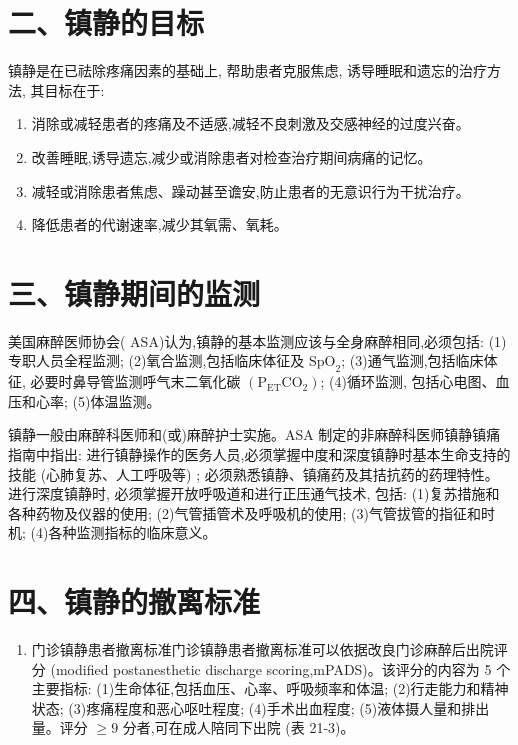 \documentclass[10pt]{article}
\begin{document}
\section*{二、镇静的目标}
镇静是在已祛除疼痛因素的基础上, 帮助患者克服焦虑, 诱导睡眠和遗忘的治疗方法, 其目标在于:

\begin{enumerate}
  \item 消除或减轻患者的疼痛及不适感,减轻不良刺激及交感神经的过度兴奋。

  \item 改善睡眠,诱导遗忘,减少或消除患者对检查治疗期间病痛的记忆。

  \item 减轻或消除患者焦虑、躁动甚至谵安,防止患者的无意识行为干扰治疗。

  \item 降低患者的代谢速率,减少其氧需、氧耗。

\end{enumerate}

\section*{三、镇静期间的监测}
美国麻醉医师协会( ASA)认为,镇静的基本监测应该与全身麻醉相同,必须包括: (1)专职人员全程监测; (2)氧合监测,包括临床体征及 $\mathrm{SpO}_{2}$; (3)通气监测,包括临床体征, 必要时鼻导管监测呼气末二氧化碳 $\left(\mathrm{P}_{\mathrm{ET}} \mathrm{CO}_{2}\right)$; (4)循环监测, 包括心电图、血压和心率; (5)体温监测。

镇静一般由麻醉科医师和(或)麻醉护士实施。ASA 制定的非麻醉科医师镇静镇痛指南中指出: 进行镇静操作的医务人员,必须掌握中度和深度镇静时基本生命支持的技能 (心肺复苏、人工呼吸等) ; 必须熟悉镇静、镇痛药及其拮抗药的药理特性。进行深度镇静时, 必须掌握开放呼吸道和进行正压通气技术, 包括: (1)复苏措施和各种药物及仪器的使用; (2)气管插管术及呼吸机的使用; (3)气管拔管的指征和时机; (4)各种监测指标的临床意义。

\section*{四、镇静的撤离标准}
\begin{enumerate}
  \item 门诊镇静患者撤离标准门诊镇静患者撤离标准可以依据改良门诊麻醉后出院评分 (modified postanesthetic discharge scoring,mPADS)。该评分的内容为 5 个主要指标: (1)生命体征,包括血压、心率、呼吸频率和体温; (2)行走能力和精神状态; (3)疼痛程度和恶心呕吐程度; (4)手术出血程度; (5)液体摄人量和排出量。评分 $\geqslant 9$ 分者,可在成人陪同下出院 (表 21-3)。
\end{enumerate}
\end{document}

